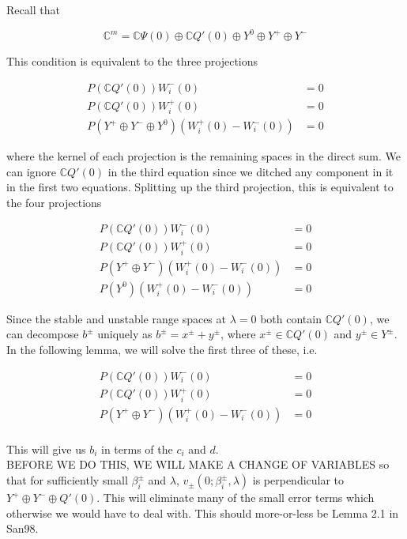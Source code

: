 \documentclass[12pt]{article}
\def\C{{\mathbb C}}
\begin{document}
Recall that

\[
\C^m = \C \Psi(0) \oplus \C Q'(0) \oplus Y^0 \oplus Y^+ \oplus Y^- 
\]

This condition is equivalent to the three projections

\begin{align*}
P(\C Q'(0))W_i^-(0) &= 0 \\
P(\C Q'(0))W_i^+(0) &= 0 \\
P(Y^+ \oplus Y^- \oplus Y^0) ( W_i^+(0) - W_i^-(0) ) &= 0
\end{align*}

where the kernel of each projection is the remaining spaces in the direct sum. We can ignore $\C Q'(0)$ in the third equation since we ditched any component in it in the first two equations. Splitting up the third projection, this is equivalent to the four projections

\begin{align*}
P(\C Q'(0))W_i^-(0) &= 0 \\
P(\C Q'(0))W_i^+(0) &= 0 \\
P(Y^+ \oplus Y^-) ( W_i^+(0) - W_i^-(0) ) &= 0 \\
P(Y^0) ( W_i^+(0) - W_i^-(0) ) &= 0
\end{align*}

Since the stable and unstable range spaces at $\lambda = 0$ both contain $\C Q'(0)$, we can decompose $b^\pm$ uniquely as $b^\pm = x^\pm + y^\pm$, where $x^\pm \in \C Q'(0)$ and $y^\pm \in Y^\pm$.\\

In the following lemma, we will solve the first three of these, i.e. 

\begin{align*}
P(\C Q'(0))W_i^-(0) &= 0 \\
P(\C Q'(0))W_i^+(0) &= 0 \\
P(Y^+ \oplus Y^-) ( W_i^+(0) - W_i^-(0) ) &= 0 \\
\end{align*}

This will give us $b_i$ in terms of the $c_i$ and $d$.\\

BEFORE WE DO THIS, WE WILL MAKE A CHANGE OF VARIABLES so that for sufficiently small $\beta_i^\pm$ and $\lambda$, $v_\pm(0; \beta_i^\pm, \lambda)$ is perpendicular to $Y^+ \oplus Y^- \oplus Q'(0)$. This will eliminate many of the small error terms which otherwise we would have to deal with. This should more-or-less be Lemma 2.1 in San98.\\
\end{document}
